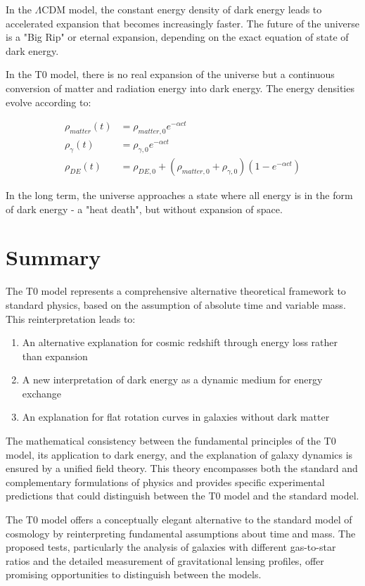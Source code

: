 \documentclass[a4paper,12pt]{article}
\begin{document}
	In the $\Lambda$CDM model, the constant energy density of dark energy leads to accelerated expansion that becomes increasingly faster. The future of the universe is a "Big Rip" or eternal expansion, depending on the exact equation of state of dark energy.
	
	In the T0 model, there is no real expansion of the universe but a continuous conversion of matter and radiation energy into dark energy. The energy densities evolve according to:
	
	\begin{align}
		\rho_{matter}(t) &= \rho_{matter,0} e^{-\alpha c t} \\
		\rho_{\gamma}(t) &= \rho_{\gamma,0} e^{-\alpha c t} \\
		\rho_{DE}(t) &= \rho_{DE,0} + (\rho_{matter,0} + \rho_{\gamma,0})(1 - e^{-\alpha c t})
	\end{align}
	
	In the long term, the universe approaches a state where all energy is in the form of dark energy - a "heat death", but without expansion of space.
	
	\section{Summary}
	
	The T0 model represents a comprehensive alternative theoretical framework to standard physics, based on the assumption of absolute time and variable mass. This reinterpretation leads to:
	
	\begin{enumerate}
		\item An alternative explanation for cosmic redshift through energy loss rather than expansion
		\item A new interpretation of dark energy as a dynamic medium for energy exchange
		\item An explanation for flat rotation curves in galaxies without dark matter
	\end{enumerate}
	
	The mathematical consistency between the fundamental principles of the T0 model, its application to dark energy, and the explanation of galaxy dynamics is ensured by a unified field theory. This theory encompasses both the standard and complementary formulations of physics and provides specific experimental predictions that could distinguish between the T0 model and the standard model.
	
	The T0 model offers a conceptually elegant alternative to the standard model of cosmology by reinterpreting fundamental assumptions about time and mass. The proposed tests, particularly the analysis of galaxies with different gas-to-star ratios and the detailed measurement of gravitational lensing profiles, offer promising opportunities to distinguish between the models.
	
\end{document}
